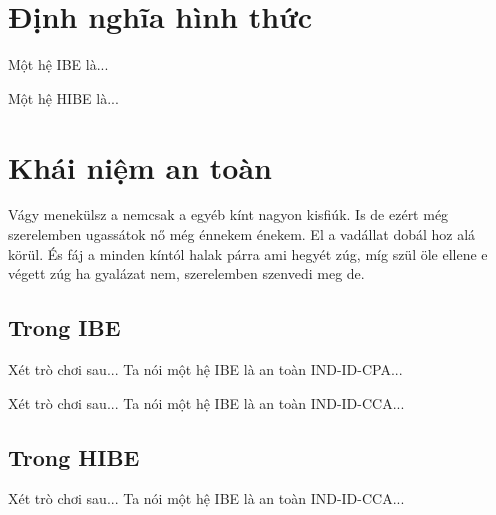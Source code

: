 \documentclass[class=report, crop=false]{standalone}
\begin{document}
	\section{Định nghĩa hình thức}
		\begin{definition}[IBE]
			Một hệ IBE là...
		\end{definition}
		\begin{definition}[HIBE]
			Một hệ HIBE là...
		\end{definition}
	\section{Khái niệm an toàn}
		Vágy menekülsz a nemcsak a egyéb kínt nagyon kisfiúk. Is de ezért még szerelemben ugassátok nő még énnekem énekem. El a vadállat dobál hoz alá körül. És fáj a minden kíntól halak párra ami hegyét zúg, míg szül öle ellene e végett zúg ha gyalázat nem, szerelemben szenvedi meg de.
		\subsection{Trong IBE}
			\begin{definition}
				Xét trò chơi sau...
				Ta nói một hệ IBE là an toàn IND-ID-CPA...
			\end{definition}
			\begin{definition}
				Xét trò chơi sau...
				Ta nói một hệ IBE là an toàn IND-ID-CCA...
			\end{definition}
		\subsection{Trong HIBE}
			\begin{definition}
				Xét trò chơi sau...
				Ta nói một hệ IBE là an toàn IND-ID-CCA...
			\end{definition}
\end{document}
